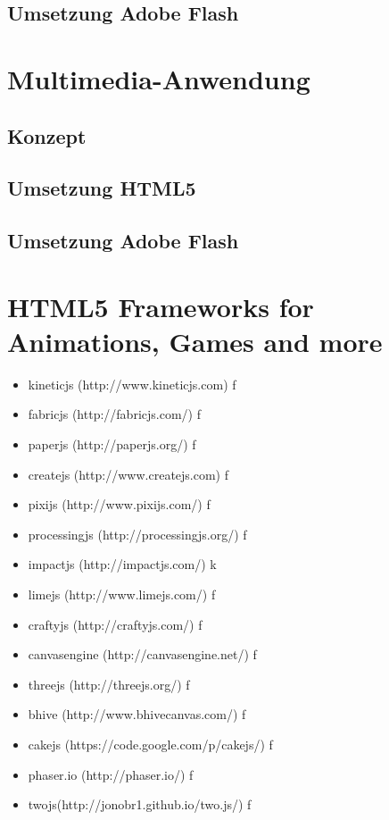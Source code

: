 \subsection{Umsetzung Adobe Flash}

\section{Multimedia-Anwendung}

\subsection{Konzept}
\subsection{Umsetzung HTML5}
\subsection{Umsetzung Adobe Flash}


\section{HTML5 Frameworks for Animations, Games and more}
\begin{itemize}
  \item kineticjs (http://www.kineticjs.com) f
  \item fabricjs (http://fabricjs.com/) f
  \item paperjs (http://paperjs.org/) f
  \item createjs (http://www.createjs.com) f
  \item pixijs (http://www.pixijs.com/) f
  \item processingjs (http://processingjs.org/) f
  \item impactjs (http://impactjs.com/) k
  \item limejs (http://www.limejs.com/) f
  \item craftyjs (http://craftyjs.com/) f
  \item canvasengine (http://canvasengine.net/) f
  \item threejs (http://threejs.org/) f
  \item bhive (http://www.bhivecanvas.com/) f
  \item cakejs (https://code.google.com/p/cakejs/) f
  \item phaser.io (http://phaser.io/) f
  \item twojs(http://jonobr1.github.io/two.js/) f
\end{itemize}